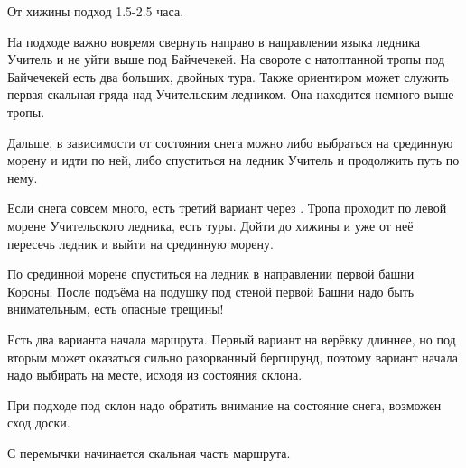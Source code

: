 От хижины \geoLighthouse{} подход 1.5-2.5 часа.


На подходе важно вовремя свернуть направо в направлении языка ледника Учитель и не уйти выше под Байчечекей. На свороте с натоптанной тропы
под Байчечекей есть два больших, двойных тура. Также ориентиром может служить первая скальная гряда над Учительским ледником. Она находится
немного выше тропы.

Дальше, в зависимости от состояния снега можно либо выбраться на срединную морену и идти по ней, либо спуститься на ледник Учитель и
продолжить путь по нему.

Если снега совсем много, есть третий вариант через . Тропа проходит по левой морене Учительского ледника,
есть туры. Дойти до хижины и уже от неё пересечь ледник и выйти на срединную морену.

По срединной морене спуститься на ледник в направлении первой башни Короны. После подъёма на подушку под стеной первой Башни надо быть
внимательным, есть опасные трещины!

Есть два варианта начала маршрута. Первый вариант на верёвку длиннее, но под вторым может оказаться сильно разорванный бергшрунд, поэтому
вариант начала надо выбирать на месте, исходя из состояния склона.

При подходе под склон надо обратить внимание на состояние снега, возможен сход доски.



С перемычки начинается скальная часть маршрута.


